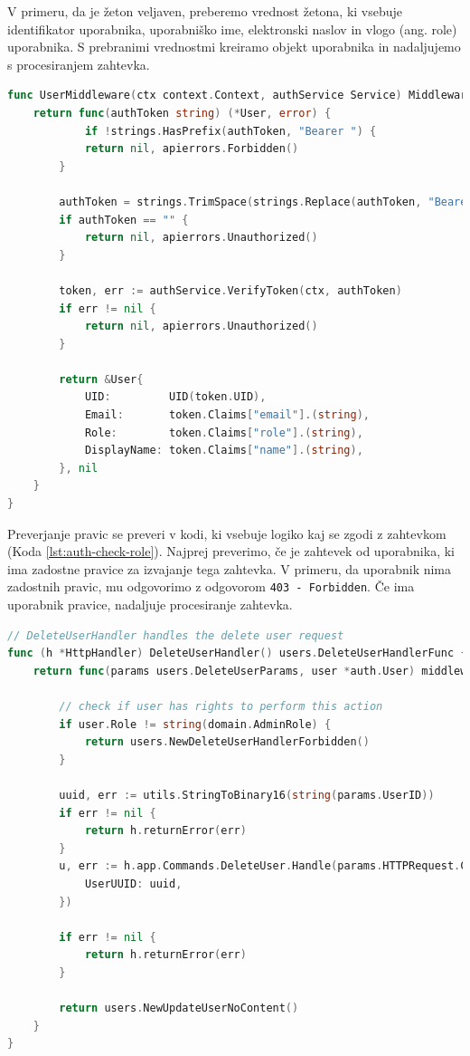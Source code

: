 \documentclass[a4paper, 12pt]{book}
\begin{document}
V primeru, da je žeton veljaven, preberemo vrednost žetona, ki vsebuje identifikator uporabnika, uporabniško ime, elektronski naslov in vlogo (ang. role) uporabnika. S prebranimi vrednostmi kreiramo objekt uporabnika in nadaljujemo s procesiranjem zahtevka.

  \begin{lstlisting}[language=go,style=mystyle,caption={Izsek kode za preverjanje pristnosti uporabnika},label=lst:auth-middleware]
func UserMiddleware(ctx context.Context, authService Service) MiddlewareFunc {
	return func(authToken string) (*User, error) {
			if !strings.HasPrefix(authToken, "Bearer ") {
			return nil, apierrors.Forbidden()
		}

		authToken = strings.TrimSpace(strings.Replace(authToken, "Bearer", "", 1))
		if authToken == "" {
			return nil, apierrors.Unauthorized()
		}

		token, err := authService.VerifyToken(ctx, authToken)
		if err != nil {
			return nil, apierrors.Unauthorized()
		}
		
		return &User{
			UID:         UID(token.UID),
			Email:       token.Claims["email"].(string),
			Role:        token.Claims["role"].(string),
			DisplayName: token.Claims["name"].(string),
		}, nil
	}
}
\end{lstlisting}

Preverjanje pravic se preveri v kodi, ki vsebuje logiko kaj se zgodi z zahtevkom (Koda \ref{lst:auth-check-role}). Najprej preverimo, če je zahtevek od uporabnika, ki ima zadostne pravice za izvajanje tega zahtevka. V primeru, da uporabnik nima zadostnih pravic, mu odgovorimo z odgovorom \verb=403 - Forbidden=. Če ima uporabnik pravice, nadaljuje procesiranje zahtevka.

\clearpage
\begin{lstlisting}[language=go,style=mystyle,caption={Izsek kode za preverjanje pravic uporabnika},label=lst:auth-check-role]
// DeleteUserHandler handles the delete user request
func (h *HttpHandler) DeleteUserHandler() users.DeleteUserHandlerFunc {
	return func(params users.DeleteUserParams, user *auth.User) middleware.Responder {

		// check if user has rights to perform this action
		if user.Role != string(domain.AdminRole) {
			return users.NewDeleteUserHandlerForbidden()
		}

		uuid, err := utils.StringToBinary16(string(params.UserID))
		if err != nil {
			return h.returnError(err)
		}
		u, err := h.app.Commands.DeleteUser.Handle(params.HTTPRequest.Context(), command.DeleteParamsCmd{
			UserUUID: uuid,
		})

		if err != nil {
			return h.returnError(err)
		}

		return users.NewUpdateUserNoContent()
	}
}
\end{lstlisting}
\clearpage
\end{document}
